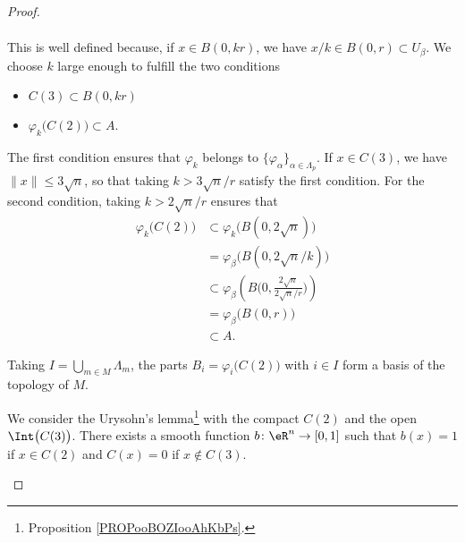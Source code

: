 \begin{proof}
\begin{subproof}
\begin{equation}
\begin{aligned}
			\end{aligned}
		\end{equation}
		This is well defined because, if \( x\in B(0,kr)\), we have \( x/k\in B(0,r)\subset U_{\beta}\). We choose \( k\) large enough to fulfill the two conditions
		\begin{itemize}
			\item
			      \( C(3)\subset B(0,kr)\)
			\item
			      \( \varphi_k\big( C(2) \big)\subset A\).
		\end{itemize}
		The first condition ensures that \( \varphi_k\) belongs to \( \{ \varphi_{\alpha} \}_{\alpha\in \Lambda_{p}}\). If \( x\in C(3)\), we have \( \| x \|\leq 3\sqrt{n}\), so that taking \( k>3\sqrt{n}/r\) satisfy the first condition. For the second condition, taking \( k>2\sqrt{n}/r\) ensures that
		\begin{subequations}
			\begin{align}
				\varphi_k\big( C(2) \big) & \subset \varphi_k\big( B(0,2\sqrt{n}) \big)                                           \\
				                          & =\varphi_{\beta}\big( B(0,2\sqrt{n}/k) \big)                                          \\
				                          & \subset\varphi_{\beta}\left( B\big( 0,\frac{ 2\sqrt{n} }{ 2\sqrt{n}/r } \big) \right) \\
				                          & =\varphi_{\beta}\big( B(0,r) \big)                                                    \\
				                          & \subset A.
			\end{align}
		\end{subequations}

		Taking \( I=\bigcup_{m\in M}\Lambda_m\), the parts \( B_i=\varphi_i\big( C(2) \big)\) with \( i\in I\) form a basis of the topology of \( M\).

		We consider the Urysohn's lemma\footnote{Proposition \ref{PROPooBOZIooAhKbPs}.} with the compact \( C(2)\) and the open \( \Int\big( C(3) \big)\). There exists a smooth function \(b \colon \eR^n\to \mathopen[ 0,1\mathclose] \) such that \( b(x)=1\) if \( x\in C(2)\) and \( C(x)=0\) if \( x\notin C(3)\).


\end{subproof}
\end{proof}
